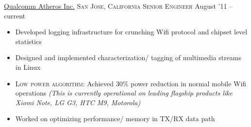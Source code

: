\documentclass[10pt,a4paper]{article} %
\begin{document}
\headedsection %
{\href{http://www.qca.qualcomm.com}{Qualcomm Atheros Inc.}}
{\textsc{San Jose, California}}{}
\headedsubsection %
{\textsc{Senior Engineer}} {August '11 -- current} {}
\bodytext
  {\begin{itemize}
	\item Developed logging infrastructure for crunching Wifi protocol and chipset level statistics
	\item Designed and implemented characterization/ tagging of multimedia streams in Linux %
	\item \textsc{Low power algorithm:} Achieved 30\% power reduction in normal mobile Wifi operations \textit{(This is currently operational on leading flagship products  like Xiomi Note, LG G3, HTC M9, Motorola)}
	\item Worked on optimizing performance/ memory in TX/RX data path
\end{itemize}}

%

\end{document}
